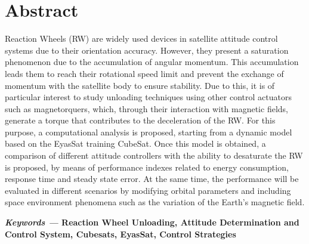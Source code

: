 \newpage

\section*{Abstract}
%



\noindent Reaction Wheels (RW) are widely used devices in satellite attitude control systems due to their orientation accuracy. However, they present a saturation phenomenon due to the accumulation of angular momentum. This accumulation leads them to reach their rotational speed limit and prevent the exchange of momentum with the satellite body to ensure stability. Due to this, it is of particular interest to study unloading techniques using other control actuators such as magnetorquers, which, through their interaction with magnetic fields, generate a torque that contributes to the deceleration of the RW. For this purpose, a computational analysis is proposed, starting from a dynamic model based on the EyasSat training CubeSat. Once this model is obtained, a comparison of different attitude controllers with the ability to desaturate the RW is proposed, by means of performance indexes related to energy consumption, response time and steady state error. At the same time, the performance will be evaluated in different scenarios by modifying orbital parameters and including space environment phenomena such as the variation of the Earth's magnetic field.


\vspace{1cm}\textbf{\textit{Keywords ---}  Reaction Wheel Unloading, Attitude Determination and Control System, Cubesats, EyasSat, Control Strategies}


\newpage

